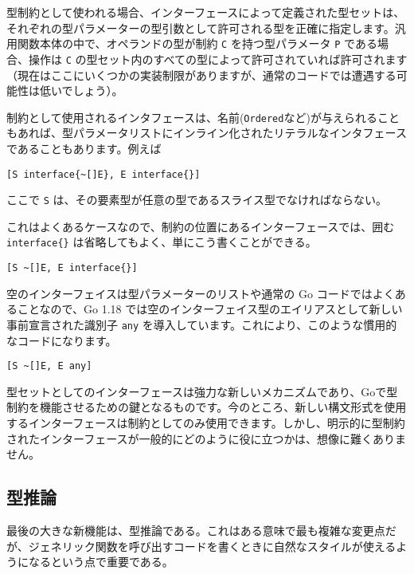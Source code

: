 型制約として使われる場合、インターフェースによって定義された型セットは、それぞれの型パラメーターの型引数として許可される型を正確に指定します。汎用関数本体の中で、オペランドの型が制約
\texttt{C} を持つ型パラメータ \texttt{P} である場合、操作は \texttt{C}
の型セット内のすべての型によって許可されていれば許可されます（現在はここにいくつかの実装制限がありますが、通常のコードでは遭遇する可能性は低いでしょう）。

制約として使用されるインタフェースは、名前(\texttt{Ordered}など)が与えられることもあれば、型パラメータリストにインライン化されたリテラルなインタフェースであることもあります。例えば

\begin{lstlisting}[numbers=none]
[S interface{~[]E}, E interface{}]
\end{lstlisting}

ここで \texttt{S}
は、その要素型が任意の型であるスライス型でなければならない。

これはよくあるケースなので、制約の位置にあるインターフェースでは、囲む
\texttt{interface\{\}} は省略してもよく、単にこう書くことができる。

\begin{lstlisting}[numbers=none]
[S ~[]E, E interface{}]
\end{lstlisting}

空のインターフェイスは型パラメーターのリストや通常の Go
コードではよくあることなので、Go 1.18
では空のインターフェイス型のエイリアスとして新しい事前宣言された識別子
\texttt{any}
を導入しています。これにより、このような慣用的なコードになります。

\begin{lstlisting}[numbers=none]
[S ~[]E, E any]
\end{lstlisting}

型セットとしてのインターフェースは強力な新しいメカニズムであり、Goで型制約を機能させるための鍵となるものです。今のところ、新しい構文形式を使用するインターフェースは制約としてのみ使用できます。しかし、明示的に型制約されたインターフェースが一般的にどのように役に立つかは、想像に難くありません。

\subsection{型推論}

最後の大きな新機能は、型推論である。これはある意味で最も複雑な変更点だが、ジェネリック関数を呼び出すコードを書くときに自然なスタイルが使えるようになるという点で重要である。

